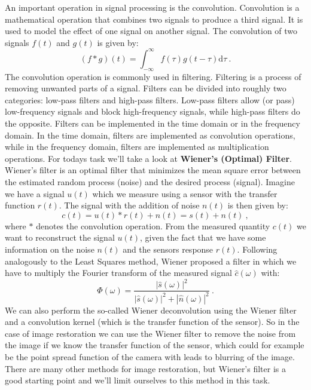 \documentclass[10pt, titlepage, a4paper]{article}
\newcommand{\dd}{\mathrm{d}}
\begin{document}
An important operation in signal processing is the convolution. Convolution is a mathematical operation that combines two signals to produce 
a third signal. It is used to model the effect of one signal on another signal. The convolution of two signals $f(t)$ and $g(t)$ is given by:
%
\begin{equation}
    (f * g)(t) = \int_{-\infty}^{\infty} f(\tau) g(t - \tau) \dd \tau\>.
\end{equation}
%
The convolution operation is commonly used in filtering. Filtering is a process of removing unwanted parts of a signal. Filters can be divided into roughly
two categories: low-pass filters and high-pass filters. Low-pass filters allow (or pass) low-frequency signals and block high-frequency signals, while high-pass
filters do the opposite. Filters can be implemented in the time domain or in the frequency domain. In the time domain, filters are implemented as convolution
operations, while in the frequency domain, filters are implemented as multiplication operations. For todays task we'll take a look at \textbf{Wiener's (Optimal) Filter}.
Wiener's filter is an optimal filter that minimizes the mean square error between the estimated random process (noise) and the desired process (signal). Imagine we
have a signal $u(t)$ which we measure using a sensor with the transfer function $r(t)$. The signal with the addition of noise $n(t)$ is then given by:
%
\begin{equation}
    c(t) = u(t) * r(t) + n(t) = s(t) + n(t)\>,
\end{equation}
%
where $*$ denotes the convolution operation. From the measured quantity $c(t)$ we want to reconstruct the signal $u(t)$, given the fact that we have some 
information on the noise $n(t)$ and the sensors response $r(t)$. Following analogously to the Least Squares method, Wiener proposed a filter in which we 
have to multiply the Fourier transform of the measured signal $\hat{c}(\omega)$  with:
%
\begin{equation}
    \Phi(\omega) = \frac{|\hat{s}(\omega)|^2}{|\hat{s}(\omega)|^2 + |\hat{n}(\omega)|^2}\>.
\end{equation}
%
We can also perform the so-called Wiener deconvolution using the Wiener filter and a convolution kernel (which is the transfer function of the sensor). So in 
the case of image restoration we can use the Wiener filter to remove the noise from the image if we know the transfer function of the sensor, which could for 
example be the point spread function of the camera with leads to blurring of the image. There are many other methods for image restoration, but 
Wiener's filter is a good starting point and we'll limit ourselves to this method in this task.
\end{document}
